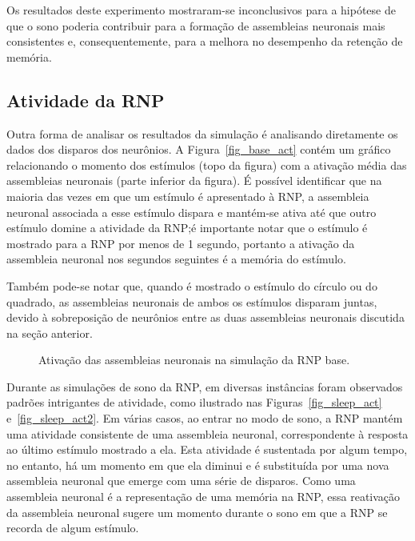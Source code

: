 Os resultados deste experimento mostraram-se inconclusivos para a hipótese de que o sono poderia contribuir para a formação de
assembleias neuronais mais consistentes e, consequentemente, para a melhora no desempenho da retenção de memória.

\subsection{Atividade da RNP}

Outra forma de analisar os resultados da simulação é analisando diretamente os dados dos disparos dos neurônios. A
Figura~\ref{fig_base_act} contém um gráfico relacionando o momento dos estímulos (topo da figura) com a ativação média das
assembleias neuronais (parte inferior da figura). É possível identificar que na maioria das vezes em que um estímulo é apresentado
à RNP, a assembleia neuronal associada a esse estímulo dispara e mantém-se ativa até que outro estímulo domine a atividade da
RNP;\@ é importante notar que o estímulo é mostrado para a RNP por menos de 1 segundo, portanto a ativação da assembleia neuronal
nos segundos seguintes é a memória do estímulo.

Também pode-se notar que, quando é mostrado o estímulo do círculo ou do quadrado, as assembleias neuronais de ambos os estímulos
disparam juntas, devido à sobreposição de neurônios entre as duas assembleias neuronais discutida na seção anterior.

\begin{figure}[!ht]
\caption{Ativação das assembleias neuronais na simulação da RNP base.}
\end{figure}

Durante as simulações de sono da RNP, em diversas instâncias foram observados padrões intrigantes de atividade, como ilustrado nas
Figuras~\ref{fig_sleep_act} e~\ref{fig_sleep_act2}. Em várias casos, ao entrar no modo de sono, a RNP mantém uma atividade
consistente de uma assembleia neuronal, correspondente à resposta ao último estímulo mostrado a ela. Esta atividade é sustentada
por algum tempo, no entanto, há um momento em que ela diminui e é substituída por uma nova assembleia neuronal que emerge com uma
série de disparos. Como uma assembleia neuronal é a representação de uma memória na RNP, essa reativação da assembleia neuronal
sugere um momento durante o sono em que a RNP se recorda de algum estímulo.

